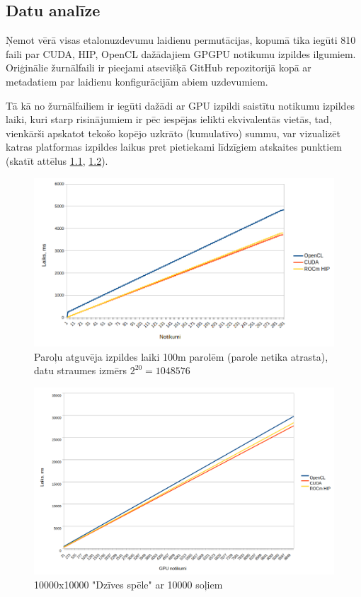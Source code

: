 \begin{center}
    \chapter{Datu analīze}
\end{center}

Ņemot vērā visas etalonuzdevumu laidienu permutācijas, kopumā tika iegūti 810
faili par CUDA, HIP, OpenCL dažādajiem GPGPU notikumu izpildes ilgumiem.
Oriģinālie žurnālfaili ir pieejami atsevišķā GitHub repozitorijā kopā
ar metadatiem par laidienu konfigurācijām abiem uzdevumiem.
\cite{bak_github_repo_log}

Tā kā no žurnālfailiem ir iegūti dažādi ar GPU izpildi saistītu notikumu
izpildes laiki, kuri starp risinājumiem ir pēc iespējas ielikti ekvivalentās
vietās, tad, vienkārši apskatot tekošo kopējo uzkrāto (kumulatīvo) summu,
var vizualizēt katras platformas izpildes laikus pret pietiekami
līdzīgiem atskaites punktiem (skatīt attēlus \ref{img:sha256_100m_not_found_cum},
\ref{img:gol_10k10k_10k_steps_cum}).

\begin{figure}[H]
    \centering
    \includegraphics[width=\textwidth]{images/sha256_100m_not_found.png}
    \caption{Paroļu atguvēja izpildes laiki 100m parolēm (parole netika
    atrasta), datu straumes izmērs \( 2^{20} = 1048576\)}
    \label{img:sha256_100m_not_found_cum}
\end{figure}

\begin{figure}[H]
    \centering
    \includegraphics[width=\textwidth]{images/gol_10k_by_10k_10ksteps.png}
    \caption{10000x10000 "Dzīves spēle" ar 10000 soļiem}
    \label{img:gol_10k10k_10k_steps_cum}
\end{figure}


